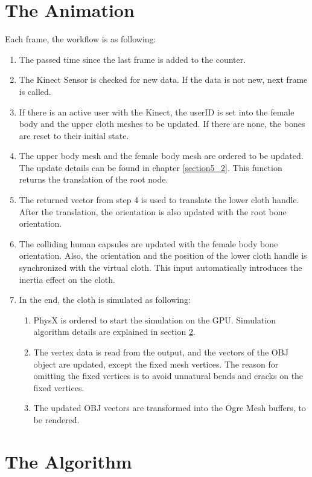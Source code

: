 \section{The Animation}
Each frame, the workflow is as following:
\begin{enumerate}
\item The passed time since the last frame is added to the counter.
\item The Kinect Sensor is checked for new data. If the data is not new, next frame is called. 
\item If there is an active user with the Kinect, the userID is set into the female body and the upper cloth meshes to be updated. If there are none, the bones are reset to their initial state.
\item The upper body mesh and the female body mesh are ordered to be updated. The update details can be found in chapter \ref{section5_2}. This function returns the translation of the root node. 
\item The returned vector from step 4 is used to translate the lower cloth handle. After the translation, the orientation is also updated with the root bone orientation.
\item The colliding human capsules are updated with the female body bone orientation. Also, the orientation and the position of the lower cloth handle is synchronized with the virtual cloth. This input automatically introduces the inertia effect on the cloth.
\item In the end, the cloth is simulated as following:
\begin{enumerate}
  \item PhysX is ordered to start the simulation on the GPU. Simulation algorithm details are explained in section \ref{section6_4}.
  \item The vertex data is read from the output, and the vectors of the OBJ object are updated, except the fixed mesh vertices. The reason for omitting the fixed vertices is to avoid unnatural bends and cracks on the fixed vertices.
  \item The updated OBJ vectors are transformed into the Ogre Mesh buffers, to be rendered. 
\end{enumerate}
\end{enumerate}

\section{The Algorithm}
\label{section6_4}

